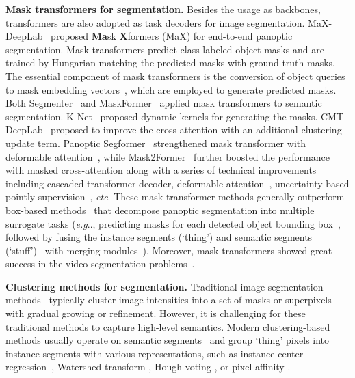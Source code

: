 \documentclass[runningheads]{llncs}
\makeatletter
\DeclareRobustCommand\onedot{\futurelet\@let@token\@onedot}
\def\@onedot{\ifx\@let@token.\else.\null\fi\xspace}
\def\eg{\emph{e.g}\onedot} \def\Eg{\emph{E.g}\onedot}
\makeatother
\begin{document}
\textbf{Mask transformers for segmentation.}\quad
Besides the usage as backbones, transformers are also adopted as task decoders for image segmentation. MaX-DeepLab~\cite{wang2021max} proposed \textbf{Ma}sk \textbf{X}formers (MaX) for end-to-end panoptic segmentation. Mask transformers predict class-labeled object masks and are trained by Hungarian matching the predicted masks with ground truth masks.
The essential component of mask transformers is the conversion of object queries to mask embedding vectors~\cite{jia2016dynamic,tian2020conditional,wang2020solov2}, which are employed to generate predicted masks.
Both Segmenter~\cite{strudel2021segmenter} and MaskFormer~\cite{cheng2021per} applied mask transformers to semantic segmentation.
K-Net~\cite{zhang2021k} proposed dynamic kernels for generating the masks. CMT-DeepLab~\cite{yu2022cmt} proposed to improve the cross-attention with an additional clustering update term. Panoptic Segformer~\cite{li2021panoptic} strengthened mask transformer with deformable attention~\cite{zhu2020deformable}, while Mask2Former~\cite{cheng2021masked} further boosted the performance with masked cross-attention along with a series of technical improvements including cascaded transformer decoder, deformable attention~\cite{zhu2020deformable}, uncertainty-based pointly supervision~\cite{kirillov2020pointrend}, \emph{etc}.
These mask transformer methods generally outperform box-based methods~\cite{kirillov2019panoptic} that decompose panoptic segmentation into multiple surrogate tasks (\eg, predicting masks for each detected object bounding box~\cite{he2017mask}, followed by fusing the instance segments (`thing') and semantic segments (`stuff')~\cite{chen2018deeplabv2} with merging modules~\cite{li2018attention,porzi2019seamless,liu2019e2e,yang2020sognet,xiong2019upsnet,li2020unifying}). Moreover, mask transformers showed great success in the video segmentation problems~\cite{kim2022tubeformer,cheng2021mask2former,li2022video}.

\textbf{Clustering methods for segmentation.}\quad
Traditional image segmentation methods~\cite{lloyd1982least,zhu1996region,achanta2012slic} typically cluster image intensities into a set of masks or superpixels with gradual growing or refinement. However, it is challenging for these traditional methods to capture high-level semantics.
Modern clustering-based methods usually operate on semantic segments~\cite{deeplabv12015,chen2017deeplabv3,deeplabv3plus2018} and group `thing' pixels into instance segments with various representations, such as instance center regression~\cite{kendall2018multi,uhrig2018box2pix,neven2019instance,yang2019deeperlab,cheng2019panoptic,wang2020axial,li2021fully}, Watershed transform \cite{vincent1991watersheds,bai2017deep}, Hough-voting \cite{ballard1981generalizing,leibe2004combined,Wang_2020_CVPR}, or pixel affinity \cite{keuper2015efficient,liu2018affinity,sofiiuk2019adaptis,gao2019ssap,hwang2019segsort}.
\end{document}
